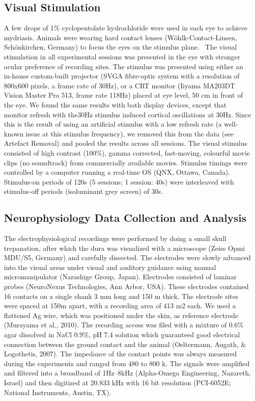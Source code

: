 \subsection{Visual Stimulation}
A few drops of 1\% cyclopentolate hydrochloride were used in each eye to achieve mydriasis.
Animals were wearing hard contact lenses (W\"ohlk-Contact-Linsen, Sch\"onkirchen, Germany) to focus the eyes on the stimulus plane.
\ The visual stimulation in all experimental sessions was presented in the eye with stronger ocular preference of recording sites.
The stimulus was presented using either an in-house custom-built projector (SVGA fibre-optic system with a resolution of 800x600 pixels, a frame rate of 30Hz), or a CRT monitor (Iiyama MA203DT Vision Master Pro 513, frame rate 118Hz) placed at eye level, 50 cm in front of the eye.
We found the same results with both display devices, except that monitor refresh with the30Hz stimulus induced cortical oscillations at 30Hz.
Since this is the result of using an artificial stimulus with a low refresh rate (a well-known issue at this stimulus frequency), we removed this from the data (see Artefact Removal) and pooled the results across all sessions.
The visual stimulus consisted of high contrast (100\%), gamma corrected, fast-moving, colourful movie clips (no soundtrack) from commercially available movies.
Stimulus timings were controlled by a computer running a real-time OS (QNX, Ottawa, Canada).
Stimulus-on periods of 120s (5 sessions; 1 session: 40s) were interleaved with stimulus-off periods (isoluminant grey screen) of 30s.


\subsection{Neurophysiology Data Collection and Analysis}
The electrophysiological recordings were performed by doing a small skull trepanation, after which the dura was visualized with a microscope (Zeiss Opmi MDU/S5, Germany) and carefully dissected.
The electrodes were slowly advanced into the visual areas under visual and auditory guidance using manual micromanipulator (Narashige Group, Japan).
Electrodes consisted of laminar probes (NeuroNexus Technologies, Ann Arbor, USA).
These electrodes contained 16 contacts on a single shank 3 mm long and 150 {\textmu}m thick.
The electrode sites were spaced at 150{\textmu}m apart, with a recording area of 413 {\textmu}m2 each.
We used a flattened \ac{Ag} wire, which was positioned under the skin, as reference electrode (Murayama et al., 2010).
The recording access was filed with a mixture of 0.6\% agar dissolved in \ac{NaCl} 0.9\%, pH 7.4 solution which guaranteed good electrical connection between the ground contact and the animal (Oeltermann, Augath, \& Logothetis, 2007).
The impedance of the contact points was always measured during the experiments and ranged from 480 to 800 k{\textohm}.
The signals were amplified and filtered into a broadband of 1Hz--8kHz (Alpha-Omega Engineering, Nazareth, Israel) and then digitized at 20.833 kHz with 16 bit resolution (PCI-6052E; National Instruments, Austin, TX).

